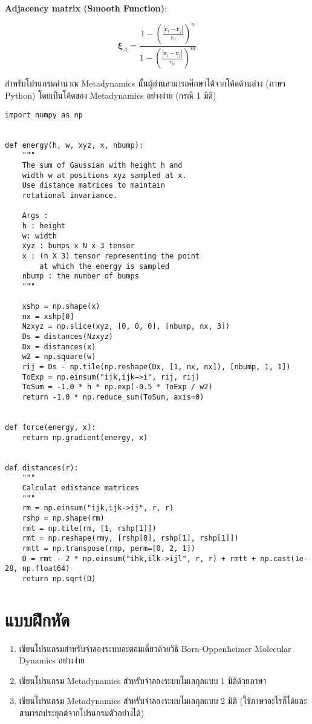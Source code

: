 \noindent \textbf{Adjacency matrix (Smooth Function)}:

\begin{equation}
  \boldsymbol{\xi}_{A} = \frac{ 1-\left(\frac{|\mathbf{r}_{i} - \mathbf{r}_{j}|}{r_{0}}\right)^n }
  { 1-\left(\frac{|\mathbf{r}_{i} - \mathbf{r}_{j}|}{r_{0}}\right)^m }
\end{equation}

สำหรับโปรแกรมคำนวณ Metadynamics นั้นผู้อ่านสามารถศึกษาได้จากโค้ดด้านล่าง (ภาษา Python) โดยเป็นโค้ดของ Metadynamics อย่างง่าย
(กรณี 1 มิติ)

\vspace{5pt}

\begin{lstlisting}[style=MyPython]
import numpy as np


def energy(h, w, xyz, x, nbump):
    """
    The sum of Gaussian with height h and
    width w at positions xyz sampled at x.
    Use distance matrices to maintain
    rotational invariance.

    Args :
    h : height
    w: width
    xyz : bumps x N x 3 tensor
    x : (n X 3) tensor representing the point
        at which the energy is sampled
    nbump : the number of bumps
    """

    xshp = np.shape(x)
    nx = xshp[0]
    Nzxyz = np.slice(xyz, [0, 0, 0], [nbump, nx, 3])
    Ds = distances(Nzxyz)
    Dx = distances(x)
    w2 = np.square(w)
    rij = Ds - np.tile(np.reshape(Dx, [1, nx, nx]), [nbump, 1, 1])
    ToExp = np.einsum("ijk,ijk−>i", rij, rij)
    ToSum = -1.0 * h * np.exp(-0.5 * ToExp / w2)
    return -1.0 * np.reduce_sum(ToSum, axis=0)


def force(energy, x):
    return np.gradient(energy, x)


def distances(r):
    """
    Calculat edistance matrices
    """
    rm = np.einsum("ijk,ijk->ij", r, r)
    rshp = np.shape(rm)
    rmt = np.tile(rm, [1, rshp[1]])
    rmt = np.reshape(rmy, [rshp[0], rshp[1], rshp[1]])
    rmtt = np.transpose(rmp, perm=[0, 2, 1])
    D = rmt - 2 * np.einsum("ihk,ilk->ijl", r, r) + rmtt + np.cast(1e-28, np.float64)
    return np.sqrt(D)
\end{lstlisting}

\vspace{5pt}

\section{แบบฝึกหัด}

\begin{enumerate}[topsep=0pt,noitemsep]
  \setlength\itemsep{1em}
  \item เขียนโปรแกรมสำหรับจำลองระบบอะตอมเดี่ยวด้วยวิธี Born-Oppenheimer Molecular Dynamics อย่างง่าย

  \item เขียนโปรแกรม Metadynamics สำหรับจำลองระบบโมเลกุลแบบ 1 มิติด้วยภาษา \cpp

  \item เขียนโปรแกรม Metadynamics สำหรับจำลองระบบโมเลกุลแบบ 2 มิติ (ใช้ภาษาอะไรก็ได้และสามารถประยุกต์จากโปรแกรมตัวอย่างได้)
\end{enumerate}

